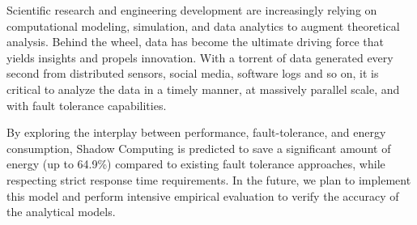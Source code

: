 Scientific research and engineering development are increasingly relying on computational modeling, simulation, and data analytics to augment theoretical analysis. Behind the wheel, data has become the ultimate driving force that yields insights and propels innovation. With a torrent of data generated every second from distributed sensors, social media, software logs and so on, it is critical to analyze the data in a timely manner,  at massively parallel scale, and with fault tolerance capabilities. 


By exploring the interplay between performance, fault-tolerance, and energy consumption, Shadow Computing is predicted to save a significant amount of energy (up to 64.9\%) compared to existing fault tolerance approaches, while respecting strict response time requirements. In the future, we plan to implement this model and perform intensive empirical evaluation to verify the accuracy of the analytical models.     